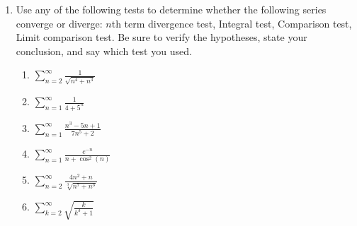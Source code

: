 \documentclass[12pt]{article}
\begin{document}
\begin{enumerate}
\pagebreak
\item Use any of the following tests to determine whether the following series converge or diverge: $n$th term divergence test, Integral test, Comparison test, Limit comparison test. Be sure to verify the hypotheses, state your conclusion, and say which test you used. 
\begin{enumerate}



\item $\displaystyle\sum_{n=2}^{\infty} \frac{1}{\sqrt{n^4+n^3}}$

\vfill



\item $\displaystyle\sum_{n=1}^{\infty} \frac{1}{4+5^n}$

\vfill
\item 
$\displaystyle\sum_{n=1}^{\infty} \frac{n^3-5n+1}{7n^5+2}$

\vfill
\pagebreak

\item $\displaystyle\sum_{n=1}^{\infty} \frac{e^{-n}}{n+\cos^2(n)}$
\vfill

\item $\displaystyle\sum_{n=2}^{\infty} \frac{4n^2+n}{\sqrt[3]{n^7+n^3}}$
\vfill 

\item $\displaystyle\sum_{k=2}^{\infty} \sqrt{\frac{k}{k^3+1}}$
\vfill
\end{enumerate} 

\end{enumerate}
\end{document}
